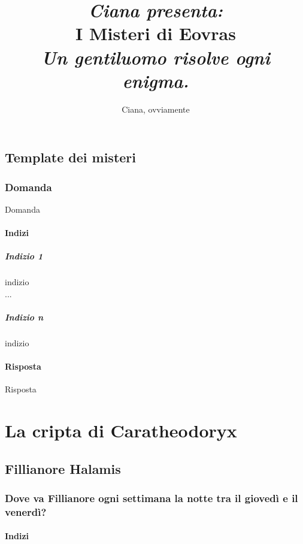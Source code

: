 \documentclass[letterpaper,twocolumn,openany,nodeprecatedcode]{dndbook}
\title{\large{\textit{Ciana presenta:}}\\
    I Misteri di Eovras \\
    \large {\textit{Un gentiluomo risolve ogni enigma.}}
    }
\author{Ciana, ovviamente}
\date{}
\begin{document}
\frontmatter

\maketitle

\tableofcontents

\mainmatter

\section{Template dei misteri}

\subsection{Domanda}
Domanda

\subsubsection{Indizi}
\paragraph{Indizio 1} indizio\\
...
\paragraph{Indizio n} indizio

\subsubsection{Risposta}
Risposta

\chapter{La cripta di Caratheodoryx}

\section{Fillianore Halamis}

\subsection{Dove va Fillianore ogni settimana la notte tra il giovedì e il venerdì?}

\subsubsection{Indizi}
\end{document}
